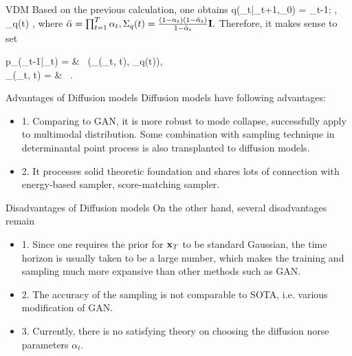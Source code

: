 \documentclass{beamer}
\begin{document}
\begin{frame}{VDM}
	Based on the previous calculation, one obtains
	\bequn
		q(\mfx_{t}|\mfx_{t+1},\mfx_0) = \mcN\lp \mfx_{t-1}; , \Sigma_q(t) \rp,
	\eequn
	where $\bar{\alpha} = \prod_{t=1}^T\alpha_t, \Sigma_q(t) = \frac{(1-\alpha_t)(1-\bar{\alpha}_t)}{1-\bar{\alpha}_t}\mathbf{I}.$ Therefore, it makes sense to set
	\bequn
		\begin{aligned}
			p_{\theta}(\mfx_{t-1}|\mfx_t) = & \ \mcN(\mu_{\theta}(\mfx_t, t), \Sigma_q(t)), 		\\
			\mu_{\theta}(\mfx_t, t) = & \ .
		\end{aligned}
	\eequn
\end{frame}



\begin{frame}{Advantages of Diffusion models}
	Diffusion models have following advantages:
	\begin{itemize}
		\item 1. Comparing to GAN, it is more robust to mode collapse, successfully apply to multimodal distribution. Some combination with sampling technique in determinantal point process is also transplanted to diffusion models.
		\item 2. It processes solid theoretic foundation and shares lots of connection with energy-based sampler, score-matching sampler.
	\end{itemize}

\end{frame}


\begin{frame}{Disadvantages of Diffusion models}
	On the other hand, several disadvantages remain
	\begin{itemize}
		\item 1. Since one requires the prior for $\mathbf{x}_T$ to be standard Gaussian, the time horizon is usually taken to be a large number, which makes the training and sampling much more expansive than other methods such as GAN.
		\item 2. The accuracy of the sampling is not comparable to SOTA, i.e. various modification of GAN.
		\item 3. Currently, there is no satisfying theory on choosing the diffusion norse parameters $\alpha_t$.
	\end{itemize}

\end{frame}
\end{document}
